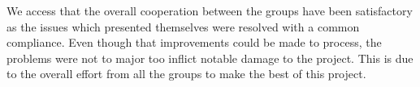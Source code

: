 We access that the overall cooperation between the groups have been satisfactory as the issues which presented themselves were resolved with a common compliance. Even though that improvements could be made to process, the problems were not to major too inflict notable damage to the project. This is due to the overall effort from all the groups to make the best of this project.




































